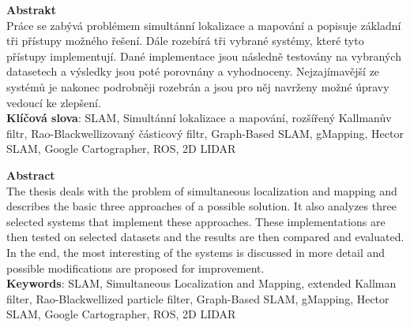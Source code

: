 \documentclass[12pt]{report}
\begin{document}
\newpage

\noindent\textbf{\Large{Abstrakt}}\\

\noindent Práce se zabývá problémem simultánní lokalizace a mapování a popisuje základní tři přístupy možného řešení. Dále rozebírá tři vybrané systémy, které tyto přístupy implementují. Dané implementace jsou následně testovány na vybraných datasetech a výsledky jsou poté porovnány a vyhodnoceny. Nejzajímavější ze systémů je nakonec podrobněji rozebrán a jsou pro něj navrženy možné úpravy vedoucí ke zlepšení.\\

\noindent\textbf{Klíčová slova}: SLAM, Simultánní lokalizace a mapování, rozšířený Kallmanův filtr, Rao-Blackwellizovaný částicový filtr, Graph-Based SLAM, gMapping, Hector SLAM, Google Cartographer, ROS, 2D LIDAR\\
\newline\newline\newline


\noindent\textbf{\Large{Abstract}}\\

\noindent The thesis deals with the problem of simultaneous localization and mapping and describes the basic three approaches of a possible solution. It also analyzes three selected systems that implement these approaches. These implementations are then tested on selected datasets and the results are then compared and evaluated. In the end, the most interesting of the systems is discussed in more detail and possible modifications are proposed for improvement.\\

\noindent\textbf{Keywords}: SLAM, Simultaneous Localization and Mapping, extended Kallman filter, Rao-Blackwellized particle filter, Graph-Based SLAM, gMapping, Hector SLAM, Google Cartographer, ROS, 2D LIDAR

\newpage	
	
\tableofcontents
\newpage
\end{document}
